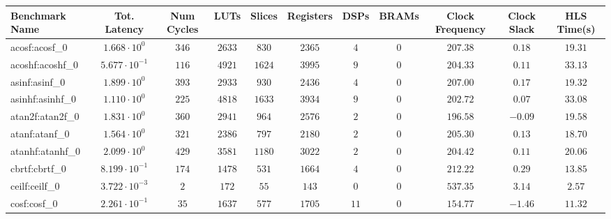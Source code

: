 \begin{tabular}{|l|c|c|c|c|c|c|c|c|c|c|}
\hline
Benchmark Name               & Tot. Latency            & Num Cycles & LUTs      & Slices    & Registers & DSPs    & BRAMs & Clock Frequency & Clock Slack & HLS Time(s) \\
\hline
acosf:acosf\_0               & $ 1.668 \cdot 10^{0}  $ & $ 346    $ & $ 2633  $ & $ 830   $ & $ 2365  $ & $ 4   $ & $ 0 $ & $ 207.38      $ & $ 0.18    $ & $ 19.31   $ \\
acoshf:acoshf\_0             & $ 5.677 \cdot 10^{-1} $ & $ 116    $ & $ 4921  $ & $ 1624  $ & $ 3995  $ & $ 9   $ & $ 0 $ & $ 204.33      $ & $ 0.11    $ & $ 33.13   $ \\
asinf:asinf\_0               & $ 1.899 \cdot 10^{0}  $ & $ 393    $ & $ 2933  $ & $ 930   $ & $ 2436  $ & $ 4   $ & $ 0 $ & $ 207.00      $ & $ 0.17    $ & $ 19.32   $ \\
asinhf:asinhf\_0             & $ 1.110 \cdot 10^{0}  $ & $ 225    $ & $ 4818  $ & $ 1633  $ & $ 3934  $ & $ 9   $ & $ 0 $ & $ 202.72      $ & $ 0.07    $ & $ 33.08   $ \\
atan2f:atan2f\_0             & $ 1.831 \cdot 10^{0}  $ & $ 360    $ & $ 2941  $ & $ 964   $ & $ 2576  $ & $ 2   $ & $ 0 $ & $ 196.58      $ & $ -0.09   $ & $ 19.58   $ \\
atanf:atanf\_0               & $ 1.564 \cdot 10^{0}  $ & $ 321    $ & $ 2386  $ & $ 797   $ & $ 2180  $ & $ 2   $ & $ 0 $ & $ 205.30      $ & $ 0.13    $ & $ 18.70   $ \\
atanhf:atanhf\_0             & $ 2.099 \cdot 10^{0}  $ & $ 429    $ & $ 3581  $ & $ 1180  $ & $ 3022  $ & $ 2   $ & $ 0 $ & $ 204.42      $ & $ 0.11    $ & $ 20.06   $ \\
cbrtf:cbrtf\_0               & $ 8.199 \cdot 10^{-1} $ & $ 174    $ & $ 1478  $ & $ 531   $ & $ 1664  $ & $ 4   $ & $ 0 $ & $ 212.22      $ & $ 0.29    $ & $ 13.85   $ \\
ceilf:ceilf\_0               & $ 3.722 \cdot 10^{-3} $ & $ 2      $ & $ 172   $ & $ 55    $ & $ 143   $ & $ 0   $ & $ 0 $ & $ 537.35      $ & $ 3.14    $ & $ 2.57    $ \\
cosf:cosf\_0                 & $ 2.261 \cdot 10^{-1} $ & $ 35     $ & $ 1637  $ & $ 577   $ & $ 1705  $ & $ 11  $ & $ 0 $ & $ 154.77      $ & $ -1.46   $ & $ 11.32   $ \\

\end{tabular}
